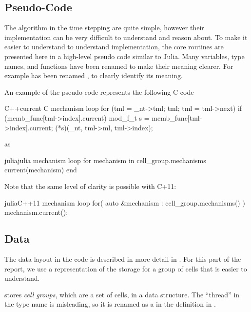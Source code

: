 \subsection{Pseudo-Code}
The algorithm in the time stepping are quite simple, however their implementation can be very difficult to understand and reason about. To make it easier to understand to understand implementation, the core routines are presented here in a high-level pseudo code similar to Julia. Many variables, type names, and functions have been renamed to make their meaning clearer. For example  has been renamed , to clearly identify its meaning.

An example of the pseudo code represents the following C code
\begin{inlinelisting}{C++}{current C mechanism loop}
for (tml = _nt->tml; tml; tml = tml->next)
  if (memb_func[tml->index].current) {
    mod_f_t s = memb_func[tml->index].current;
    (*s)(_nt, tml->ml, tml->index);
  }
\end{inlinelisting}
\noindent as
\begin{inlinelisting}{julia}{julia mechanism loop}
for mechanism in cell_group.mechanisms
  current(mechanism)
end
\end{inlinelisting}

\noindent Note that the same level of clarity is possible with C+11:
\begin{inlinelisting}{julia}{C++11 mechanism loop}
for( auto &mechanism : cell_group.mechanisms() ) {
  mechanism.current();
}
\end{inlinelisting}

\subsection{Data}
The data layout in the \neuron code is described in more detail in . For this part of the report, we use a representation of the storage for a group of cells that is easier to understand.

\neuron stores \emph{cell groups}, which are a set of cells, in a  data structure. The ``thread'' in the type name is misleading, so it is renamed as a  in the definition in .

